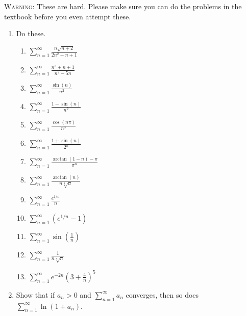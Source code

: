 \documentclass[11pt]{article}
\begin{document}
\noindent \textsc{Warning:} These are hard. Please make sure you can do the
problems in the textbook before you even attempt these.

\begin{enumerate}

  \item Do these. \begin{enumerate}

    \item $\displaystyle \sum_{n=1}^\infty
    \frac{n\sqrt{n+2}}{2n^2-n+1}$

    \item $\displaystyle \sum_{n=1}^\infty
    \frac{n^3+n+1}{n^2-5n}$

    \item $\displaystyle \sum_{n=1}^\infty
    \frac{\sin(n)}{n^2}$

    \item $\displaystyle \sum_{n=1}^\infty
    \frac{1-\sin(n)}{n^2}$

    \item $\displaystyle \sum_{n=1}^\infty
    \frac{\cos(n\pi)}{n^3}$

    \item $\displaystyle \sum_{n=1}^\infty
    \frac{1+\sin(n)}{2^n}$

    \item $\displaystyle \sum_{n=1}^\infty
    \frac{\arctan(1-n) - \pi}{\pi^n}$

    \item $\displaystyle \sum_{n=1}^\infty
    \frac{\arctan(n)}{n\sqrt[3]n}$

    \item $\displaystyle \sum_{n=1}^\infty
    \frac{e^{1/n}}{n}$

    \item $\displaystyle \sum_{n=1}^\infty
    \left( e^{1/n} - 1 \right)$

    \item $\displaystyle \sum_{n=1}^\infty
    \sin\left( \frac1n \right)$

    \item $\displaystyle \sum_{n=1}^\infty
    \frac1{n\sqrt[n]n}$

    \item $\displaystyle \sum_{n=1}^\infty
    e^{-2n} \left( 3 + \frac4n \right)^5$

  \end{enumerate}

  \item Show that if $a_n > 0$ and $\displaystyle \sum_{n=1}^\infty a_n$
  converges, then so does $\displaystyle \sum_{n=1}^\infty \ln(1+a_n)$.


\end{enumerate}
\end{document}
